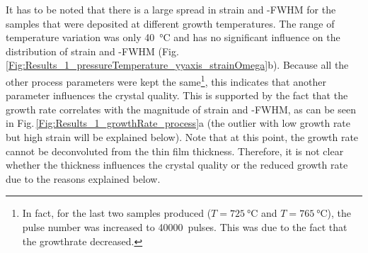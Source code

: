 It has to be noted that there is a large spread in strain and \textomega-FWHM for the samples that were deposited at different growth temperatures.
The range of temperature variation was only \qty{40}{\degreeCelsius} and has no significant influence on the distribution of strain and \textomega-FWHM (Fig.\,\ref{Fig:Results_1_pressureTemperature_yyaxis_strainOmega}b).
Because all the other process parameters were kept the same\footnote{
    In fact, for the last two samples produced ($T=\qty{725}{\degreeCelsius}$ and $T=\qty{765}{\degreeCelsius}$), the pulse number was increased to \qty{40000}{pulses}.
    This was due to the fact that the growthrate decreased.
},
this indicates that another parameter influences the crystal quality.
This is supported by the fact that the growth rate correlates with the magnitude of strain and \textomega-FWHM, as can be seen in Fig.\,\ref{Fig:Results_1_growthRate_process}a (the outlier with low growth rate but high strain will be explained below).
Note that at this point, the growth rate cannot be deconvoluted from the thin film thickness.
Therefore, it is not clear whether the thickness influences the crystal quality or the reduced growth rate due to the reasons explained below.

